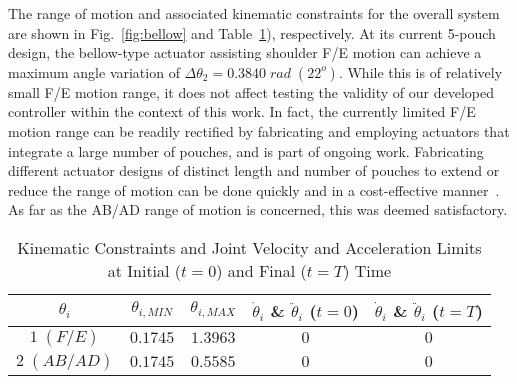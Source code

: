 \documentclass[letterpaper, 10pt, conference]{ieeeconf}      %
\begin{document}
The range of motion and associated kinematic constraints for the overall system are shown in Fig.~\ref{fig:bellow} and Table~\ref{table:constr}), respectively. At its current 5-pouch design, the bellow-type actuator assisting shoulder F/E motion can achieve a maximum angle variation of $\Delta\theta_2 = 0.3840 \; rad \;(22^o)$. %
While this is of relatively small F/E motion range, it does not affect testing the validity of our developed controller within the context of this work. In fact, the currently limited F/E motion range can be readily rectified by fabricating and employing actuators that integrate a large number of pouches, and is part of ongoing work. 
Fabricating different actuator designs of distinct length and number of pouches to extend or reduce the range of motion can be done quickly and in a cost-effective manner~\cite{sahin2022bidirectional}.
%
As far as the AB/AD range of motion is concerned, this was deemed satisfactory. 

\begin{table}[!ht]
\centering
\caption{Kinematic Constraints and Joint Velocity and Acceleration Limits at Initial ($t=0$) and Final ($t=T$) Time}
\label{table:constr}
\vspace{-6pt}
\begin{tabular}{ccccc}
\toprule
$\theta_i$ &  $\theta_{i,MIN}$ & $\theta_{i,MAX}$ &  
$\dot{\theta}_i$ \& $\ddot{\theta}_i$ ($t=0$) &
$\dot{\theta}_i$ \& $\ddot{\theta}_i$ ($t=T$) \\%
\midrule
$1\;(F/E)$ & $0.1745$    & $1.3963$ & $0$  & $0$\\
$2\;(AB/AD)$ & $0.1745$    & $0.5585$ & $0$  & $0$\\
\bottomrule
\end{tabular}
\vspace{-8pt}
\end{table}

%
%
    
\end{document}
